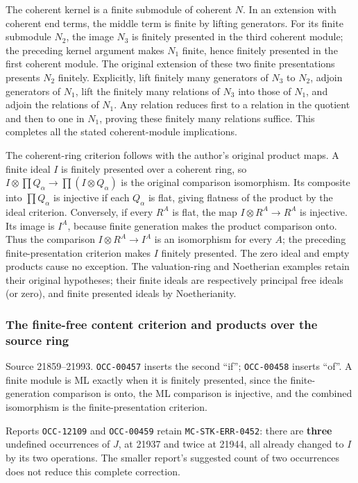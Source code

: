 The coherent kernel is a finite submodule of coherent \(N\). In an extension with coherent end terms, the middle term is finite by lifting generators. For its finite submodule \(N_2\), the image \(N_3\) is finitely presented in the third coherent module; the preceding kernel argument makes \(N_1\) finite, hence finitely presented in the first coherent module. The original extension of these two finite presentations presents \(N_2\) finitely. Explicitly, lift finitely many generators of \(N_3\) to \(N_2\), adjoin generators of \(N_1\), lift the finitely many relations of \(N_3\) into those of \(N_1\), and adjoin the relations of \(N_1\). Any relation reduces first to a relation in the quotient and then to one in \(N_1\), proving these finitely many relations suffice. This completes all the stated coherent-module implications.

The coherent-ring criterion follows with the author's original product maps. A finite ideal \(I\) is finitely presented over a coherent ring, so \(I\otimes\prod Q_\alpha\to\prod(I\otimes Q_\alpha)\) is the original comparison isomorphism. Its composite into \(\prod Q_\alpha\) is injective if each \(Q_\alpha\) is flat, giving flatness of the product by the ideal criterion. Conversely, if every \(R^A\) is flat, the map \(I\otimes R^A\to R^A\) is injective. Its image is \(I^A\), because finite generation makes the product comparison onto. Thus the comparison \(I\otimes R^A\to I^A\) is an isomorphism for every \(A\); the preceding finite-presentation criterion makes \(I\) finitely presented. The zero ideal and empty products cause no exception. The valuation-ring and Noetherian examples retain their original hypotheses; their finite ideals are respectively principal free ideals (or zero), and finite presented ideals by Noetherianity.

\subsubsection{The finite-free content criterion and products over the source ring}\label{algebra-proof-013-the-finite-free-content-criterion-and-products-over-the-source-ring}

Source 21859--21993. \texttt{OCC-00457} inserts the second ``if''; \texttt{OCC-00458} inserts ``of''. A finite module is ML exactly when it is finitely presented, since the finite-generation comparison is onto, the ML comparison is injective, and the combined isomorphism is the finite-presentation criterion.

Reports \texttt{OCC-12109} and \texttt{OCC-00459} retain \texttt{MC-\AlgebraIdentifierBreak{}STK-\AlgebraIdentifierBreak{}ERR-\AlgebraIdentifierBreak{}0452}: there are \textbf{three} undefined occurrences of \(J\), at 21937 and twice at 21944, all already changed to \(I\) by its two operations. The smaller report's suggested count of two occurrences does not reduce this complete correction.

